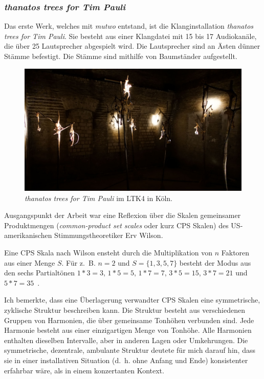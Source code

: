 \documentclass[12pt,a4paper,ngerman]{article}
\begin{document}
\subsubsection{\emph{thanatos trees for Tim Pauli}}
\label{thanatosTreesChapter}

Das erste Werk, welches mit \emph{mutwo} entstand, ist die Klanginstallation \emph{thanatos trees for Tim Pauli}.
Sie besteht aus einer Klangdatei mit 15 bis 17 Audiokanäle, die über 25 Lautsprecher abgespielt wird.
Die Lautsprecher sind an Ästen dünner Stämme befestigt.
Die Stämme sind mithilfe von Baumständer aufgestellt.

\begin{figure}[h!]
    \includegraphics[scale=0.28]{pictures/ltk4_open_call_2021_6.jpg}

    \caption{%
        \emph{thanatos trees for Tim Pauli} im LTK4 in Köln.
    }
\end{figure}

Ausgangspunkt der Arbeit war eine Reflexion über die Skalen gemeinsamer Produktmengen (\emph{common-product set scales} oder kurz CPS Skalen) des US-amerikanischen Stimmungstheoretiker Erv Wilson.

\smallskip

Eine CPS Skala nach Wilson ensteht durch die Multiplikation von $n$ Faktoren aus einer Menge $S$.
Für z.~B. $n=2$ und $S=\{1, 3, 5, 7\}$ besteht der Modus aus den sechs Partialtönen $1*3=3$, $1*5=5$, $1*7=7$, $3*5=15$, $3*7=21$ und $5*7=35$~\parencite[S. 150f]{ervWilsonBook}.

\smallskip

Ich bemerkte, dass eine Überlagerung verwandter CPS Skalen eine symmetrische, zyklische Struktur beschreiben kann.
Die Struktur besteht aus verschiedenen Gruppen von Harmonien, die über gemeinsame Tonhöhen verbunden sind.
Jede Harmonie besteht aus einer einzigartigen Menge von Tonhöhe.
Alle Harmonien enthalten dieselben Intervalle, aber in anderen Lagen oder Umkehrungen.
Die symmetrische, dezentrale, ambulante Struktur deutete für mich darauf hin, dass sie in einer installativen Situation (d.~h. ohne Anfang und Ende) konsistenter erfahrbar wäre, als in einem konzertanten Kontext.
\end{document}
